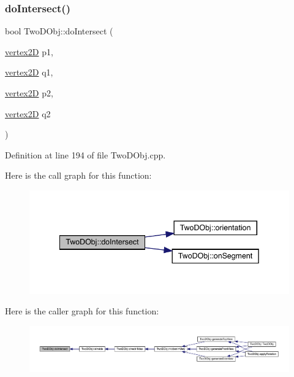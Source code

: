 \subsubsection{\texorpdfstring{do\+Intersect()}{doIntersect()}}
{\footnotesize\ttfamily bool Two\+D\+Obj\+::do\+Intersect (\begin{DoxyParamCaption}\item[{\mbox{\hyperlink{structvertex2_d}{vertex2D}}}]{p1,  }\item[{\mbox{\hyperlink{structvertex2_d}{vertex2D}}}]{q1,  }\item[{\mbox{\hyperlink{structvertex2_d}{vertex2D}}}]{p2,  }\item[{\mbox{\hyperlink{structvertex2_d}{vertex2D}}}]{q2 }\end{DoxyParamCaption})}



Definition at line 194 of file Two\+D\+Obj.\+cpp.

Here is the call graph for this function\+:
\nopagebreak
\begin{figure}[H]
\begin{center}
\leavevmode
\includegraphics[width=342pt]{class_two_d_obj_a86158be2b2314a79b2eaa262c28738d5_cgraph}
\end{center}
\end{figure}
Here is the caller graph for this function\+:
\nopagebreak
\begin{figure}[H]
\begin{center}
\leavevmode
\includegraphics[width=350pt]{class_two_d_obj_a86158be2b2314a79b2eaa262c28738d5_icgraph}
\end{center}
\end{figure}
\mbox{\label{class_two_d_obj_a40fa2f831edda30806a28e30ae0b0feb}} 
